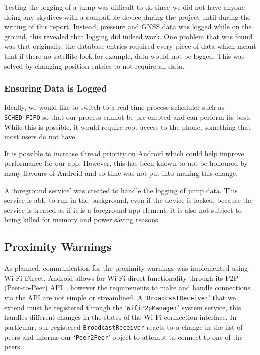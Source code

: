 Testing the logging of a jump was difficult to do since we did not have anyone doing any skydives with a compatible device during the project until during the writing of this report. Instead, pressure and GNSS data was logged while on the ground, this revealed that logging did indeed work. One problem that was found was that originally, the database entries required every piece of data which meant that if there no satellite lock for example, data would not be logged. This was solved by changing position entries to not require all data.

\subsubsection{Ensuring Data is Logged}
Ideally, we would like to switch to a real-time process scheduler such as \texttt{SCHED\_FIFO} so that our process cannot be pre-empted and can perform its best. While this is possible, it would require root access to the phone, something that most users do not have.

It is possible to increase thread priority on Android which could help improve performance for our app. However, this has been known to not be honoured by many flavours of Android and so time was not put into making this change.

A `foreground service' was created to handle the logging of jump data. This service is able to run in the background, even if the device is locked, because the service is treated as if it is a foreground app element, it is also not subject to being killed for memory and power saving reasons.

\subsection{Proximity Warnings}
As planned, communication for the proximity warnings was implemented using Wi-Fi Direct. Android allows for Wi-Fi direct functionality through its P2P (Peer-to-Peer) API~\cite{_creating_????}, however the requirements to make and handle connections via the API are not simple or streamlined. A `\texttt{BroadcastReceiver}' that we extend must be registered through the `\texttt{WifiP2pManager}' system service, this handles different changes in the states of the Wi-Fi connection interface. In particular, our registered \texttt{BroadcastReceiver} reacts to a change in the list of peers and informs our `\texttt{Peer2Peer}' object to attempt to connect to one of the peers.

